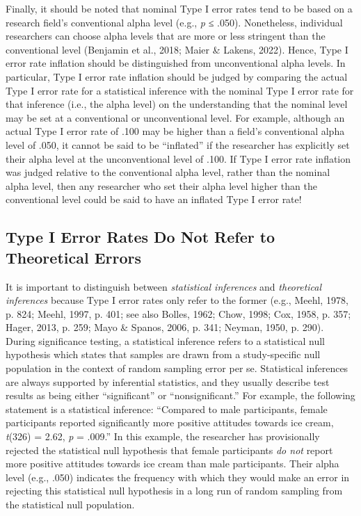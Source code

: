 \documentclass[authordate, empirical]{jote-new-article}
\begin{document}
	Finally, it should be noted that nominal Type I error rates tend to be based on a research field's conventional alpha level (e.g., \emph{p} ≤ .050). Nonetheless, individual researchers can choose alpha levels that are more or less stringent than the conventional level (Benjamin et al., 2018; Maier \& Lakens, 2022). Hence, Type I error rate inflation should be distinguished from unconventional alpha levels. In particular, Type I error rate inflation should be judged by comparing the actual Type I error rate for a statistical inference with the nominal Type I error rate for that inference (i.e., the alpha level) on the understanding that the nominal level may be set at a conventional or unconventional level. For example, although an actual Type I error rate of .100 may be higher than a field's conventional alpha level of .050, it cannot be said to be “inflated” if the researcher has explicitly set their alpha level at the unconventional level of .100. If Type I error rate inflation was judged relative to the conventional alpha level, rather than the nominal alpha level, then any researcher who set their alpha level higher than the conventional level could be said to have an inflated Type I error rate!



	\subsection{Type I Error Rates Do Not Refer to Theoretical Errors}



	It is important to distinguish between \emph{statistical inferences} and\emph{ theoretical inferences} because Type I error rates only refer to the former (e.g., Meehl, 1978, p. 824; Meehl, 1997, p. 401; see also Bolles, 1962; Chow, 1998; Cox, 1958, p. 357; Hager, 2013, p. 259; Mayo \& Spanos, 2006, p. 341; Neyman, 1950, p. 290). During significance testing, a statistical inference refers to a statistical null hypothesis which states that samples are drawn from a study-specific null population in the context of random sampling error per se. Statistical inferences are always supported by inferential statistics, and they usually describe test results as being either “significant” or “nonsignificant.” For example, the following statement is a statistical inference: “Compared to male participants, female participants reported significantly more positive attitudes towards ice cream, \emph{t}(326) = 2.62, \emph{p} = .009.” In this example, the researcher has provisionally rejected the statistical null hypothesis that female participants \emph{do not} report more positive attitudes towards ice cream than male participants. Their alpha level (e.g., .050) indicates the frequency with which they would make an error in rejecting this statistical null hypothesis in a long run of random sampling from the statistical null population.
\end{document}
